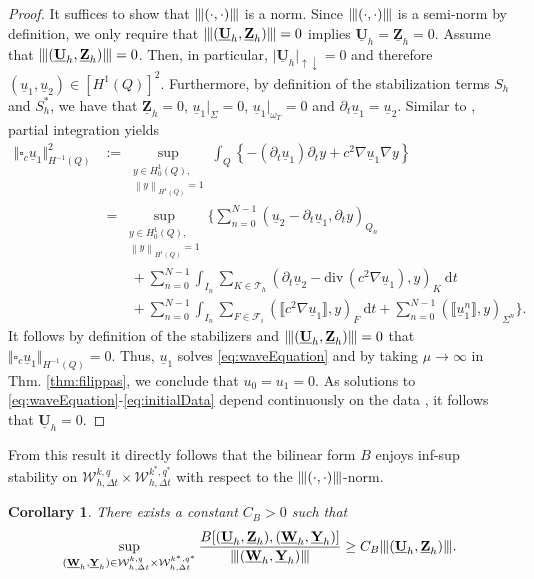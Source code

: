 \documentclass[sn-mathphys-num]{sn-jnl}
\newtheorem{cor}[thm]{Corollary}
\numberwithin{equation}{section}
\newcommand{\jump}[1]{\llbracket#1\rrbracket}
\renewcommand{\div}{\mathrm{div}\,}  %
\newcommand{\wop}{\square_c}
\newcommand{\tnorm}[1]{\vert\hspace{-0.3mm}\Vert#1\Vert\hspace{-0.3mm}\vert}
\providecommand{\norm}[1]{\left\lVert#1\right\rVert}
\providecommand{\norm}[1]{\left\lVert#1\right\rVert}
\newcommand{\dT}{\mathrm{d}t}
\newcommand{\ProdFullyDiscrSpace}[2]{ \mathcal{W}^{ {#1},{#2}}_{h, \Delta t  } }
\newcommand{\Uh}{\underline{\mathbf{U}}_h}
\newcommand{\Yh}{\underline{\mathbf{Y}}_h}
\newcommand{\Zh}{\underline{\mathbf{Z}}_h}
\newcommand{\Wh}{\underline{\mathbf{W}}_h}
\newcommand{\ul}{\underline{u}}
\newcommand{\dt}{\partial_t}
\begin{document}
\begin{proof}
    It suffices to show that $\tnorm{(\cdot,\cdot)}$ is a norm. Since $\tnorm{(\cdot,\cdot)}$ is a semi-norm by definition, we only require that $\tnorm{(\Uh,\Zh)} = 0$ implies $\Uh=\Zh= 0$. Assume that $\tnorm{(\Uh,\Zh)} = 0$. Then, in particular, $\vert \Uh \vert_{\uparrow \downarrow} = 0$ and therefore $(\ul_1,\ul_2) \in [H^1(Q)]^2$. Furthermore, by definition of the stabilization terms $S_h$ and $S_h^{\ast}$, we have that $\Zh = 0$, $\ul_1 \vert_{\Sigma} = 0$, $\ul_1 \vert_{\omega_T} = 0$ and $\dt \ul_1 = \ul_2$. Similar to \cite[Lem. 2.1]{BP24}, partial integration yields 
    \begin{align*}
        \Vert \wop \ul_1 \Vert^2_{H^{-1}(Q)} &:= \sup_{\substack{  y \in H^1_0(Q), \\ \norm{y}_{H^1(Q) } = 1  }} \int_{Q} \left\{ -(\dt \ul_1) \dt y + c^2 \nabla \ul_1 \nabla y \right\}  \\
        &= \sup_{\substack{  y \in H^1_0(Q), \\ \norm{y}_{H^1(Q) } = 1  }} \Big\{ \sum_{n = 0}^{N-1} (\ul_2 - \dt \ul_1, \dt y)_{Q_n} \\
        &\qquad+ \sum_{n = 0}^{N-1} \int_{I_n} \sum_{K \in \mathcal{T}_h} (\dt \ul_2 - \div(c^2 \nabla \ul_1),y)_{K} \ \dT \\
        &\qquad + \sum_{n = 0}^{N-1} \int_{I_n} \sum_{F \in \mathcal{F}_i} (\jump{c^2 \nabla \ul_1}, y)_F \ \dT + \sum_{n = 0}^{N-1} (\jump{\ul_1^n},y)_{\Sigma^n} \Big\}.
    \end{align*}
    It follows by definition of the stabilizers and $\tnorm{(\Uh,\Zh)} = 0$ that $\Vert \wop \ul_1 \Vert_{H^{-1}(Q)} = 0$. Thus, $\ul_1$ solves \eqref{eq:waveEquation} and by taking $\mu \rightarrow \infty$ in Thm. \ref{thm:filippas}, we conclude that $u_0 = u_1 = 0$. As solutions to \eqref{eq:waveEquation}-\eqref{eq:initialData} depend continuously on the data \cite{StolkPhD}, it follows that $\Uh = 0$. 
\end{proof}

\noindent From this result it directly follows that the bilinear form $B$ enjoys inf-sup stability on $\ProdFullyDiscrSpace{k}{q} \times \ProdFullyDiscrSpace{k^\ast}{q^\ast}$ with respect to the $\tnorm{(\cdot,\cdot)}$-norm. 

\begin{cor}
    There exists a constant $C_B>0$ such that 
    \begin{equation}
        \sup_{(\Wh,\Yh) \in \ProdFullyDiscrSpace{k}{q} \times \ProdFullyDiscrSpace{k^\ast}{q^\ast}} \frac{B[(\Uh,\Zh),(\Wh,\Yh)]}{\tnorm{(\Wh,\Yh)}} \ge C_B \tnorm{(\Uh,\Zh)}.
    \end{equation}
\end{cor}
\end{document}
